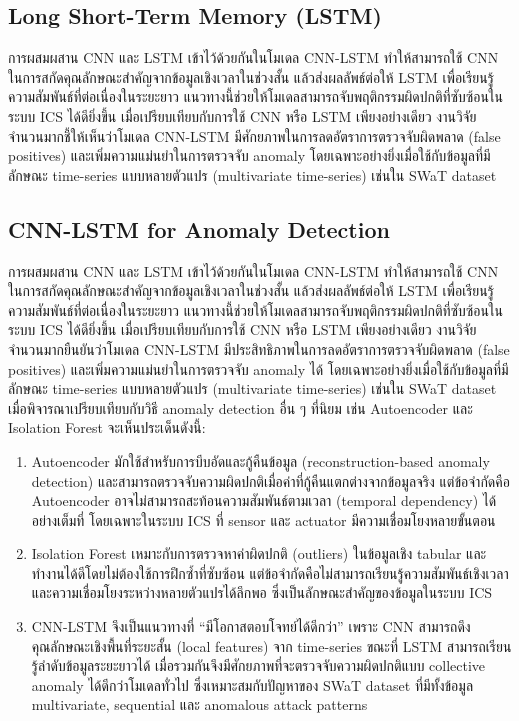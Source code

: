 \subsection{Long Short-Term Memory (LSTM)}
\hspace{2em} การผสมผสาน CNN และ LSTM เข้าไว้ด้วยกันในโมเดล CNN-LSTM ทำให้สามารถใช้ CNN ในการสกัดคุณลักษณะสำคัญจากข้อมูลเชิงเวลาในช่วงสั้น แล้วส่งผลลัพธ์ต่อให้ LSTM เพื่อเรียนรู้ความสัมพันธ์ที่ต่อเนื่องในระยะยาว แนวทางนี้ช่วยให้โมเดลสามารถจับพฤติกรรมผิดปกติที่ซับซ้อนในระบบ ICS ได้ดียิ่งขึ้น เมื่อเปรียบเทียบกับการใช้ CNN หรือ LSTM เพียงอย่างเดียว งานวิจัยจำนวนมากชี้ให้เห็นว่าโมเดล CNN-LSTM มีศักยภาพในการลดอัตราการตรวจจับผิดพลาด (false positives) และเพิ่มความแม่นยำในการตรวจจับ anomaly โดยเฉพาะอย่างยิ่งเมื่อใช้กับข้อมูลที่มีลักษณะ time-series แบบหลายตัวแปร (multivariate time-series) เช่นใน SWaT dataset

\subsection{CNN-LSTM for Anomaly Detection}
\hspace{2em} การผสมผสาน CNN และ LSTM เข้าไว้ด้วยกันในโมเดล CNN-LSTM ทำให้สามารถใช้ CNN ในการสกัดคุณลักษณะสำคัญจากข้อมูลเชิงเวลาในช่วงสั้น แล้วส่งผลลัพธ์ต่อให้ LSTM เพื่อเรียนรู้ความสัมพันธ์ที่ต่อเนื่องในระยะยาว แนวทางนี้ช่วยให้โมเดลสามารถจับพฤติกรรมผิดปกติที่ซับซ้อนในระบบ ICS ได้ดียิ่งขึ้น เมื่อเปรียบเทียบกับการใช้ CNN หรือ LSTM เพียงอย่างเดียว งานวิจัยจำนวนมากยืนยันว่าโมเดล CNN-LSTM มีประสิทธิภาพในการลดอัตราการตรวจจับผิดพลาด (false positives) และเพิ่มความแม่นยำในการตรวจจับ anomaly ได้ โดยเฉพาะอย่างยิ่งเมื่อใช้กับข้อมูลที่มีลักษณะ time-series แบบหลายตัวแปร (multivariate time-series) เช่นใน SWaT dataset
\\ เมื่อพิจารณาเปรียบเทียบกับวิธี anomaly detection อื่น ๆ ที่นิยม เช่น Autoencoder และ Isolation Forest จะเห็นประเด็นดังนี้:
\begin{enumerate}
  \item Autoencoder มักใช้สำหรับการบีบอัดและกู้คืนข้อมูล (reconstruction-based anomaly detection) และสามารถตรวจจับความผิดปกติเมื่อค่าที่กู้คืนแตกต่างจากข้อมูลจริง แต่ข้อจำกัดคือ Autoencoder อาจไม่สามารถสะท้อนความสัมพันธ์ตามเวลา (temporal dependency) ได้อย่างเต็มที่ โดยเฉพาะในระบบ ICS ที่ sensor และ actuator มีความเชื่อมโยงหลายขั้นตอน
  \item Isolation Forest เหมาะกับการตรวจหาค่าผิดปกติ (outliers) ในข้อมูลเชิง tabular และทำงานได้ดีโดยไม่ต้องใช้การฝึกซ้ำที่ซับซ้อน แต่ข้อจำกัดคือไม่สามารถเรียนรู้ความสัมพันธ์เชิงเวลาและความเชื่อมโยงระหว่างหลายตัวแปรได้ลึกพอ ซึ่งเป็นลักษณะสำคัญของข้อมูลในระบบ ICS
  \item CNN-LSTM จึงเป็นแนวทางที่ “มีโอกาสตอบโจทย์ได้ดีกว่า” เพราะ CNN สามารถดึงคุณลักษณะเชิงพื้นที่ระยะสั้น (local features) จาก time-series ขณะที่ LSTM สามารถเรียนรู้ลำดับข้อมูลระยะยาวได้ เมื่อรวมกันจึงมีศักยภาพที่จะตรวจจับความผิดปกติแบบ collective anomaly ได้ดีกว่าโมเดลทั่วไป ซึ่งเหมาะสมกับปัญหาของ SWaT dataset ที่มีทั้งข้อมูล multivariate, sequential และ anomalous attack patterns
\end{enumerate}
